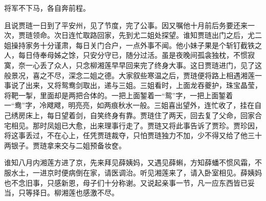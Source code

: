 将军不下马，各自奔前程。

且说贾琏一日到了平安州，见了节度，完了公事。因又嘱他十月前后务要还来一次，贾琏领命。次日连忙取路回家，先到尤二姐处探望。谁知贾琏出门之后，尤二姐操持家务十分谨肃，每日关门合户，一点外事不闻。他小妹子果是个斩钉截铁之人，每日侍奉母姊之馀，只安分守已，随分过活。虽是夜晚间孤衾独枕，不惯寂寞，奈一心丢了众人，只念柳湘莲早早回来完了终身大事。这日贾琏进门，见了这般景况，喜之不尽，深念二姐之德。大家叙些寒温之后，贾琏便将路上相遇湘莲一事说了出来，又将鸳鸯剑取出，递与三姐。三姐看时，上面龙吞夔护，珠宝晶莹，将靶一掣，里面却是两把合体的。一把上面錾着一``鸳''字，一把上面錾着一``鸯''字，冷飕飕，明亮亮，如两痕秋水一般。三姐喜出望外，连忙收了，挂在自己绣房床上，每日望着剑，自笑终身有靠。贾琏住了两天，回去复了父命，回家合宅相见。那时凤姐已大愈，出来理事行走了。贾琏又将此事告诉了贾珍。贾珍因，将这事丢过，不在心上，任凭贾琏裁夺，只怕贾琏独力不加，少不得又给了他三十两银子。贾琏拿来交与二姐预备妆奁。

谁知八月内湘莲方进了京，先来拜见薛姨妈，又遇见薛蝌，方知薛蟠不惯风霜，不服水土，一进京时便病倒在家，请医调治。听见湘莲来了，请入卧室相见。薛姨妈也不念旧事，只感新恩，母子们十分称谢。又说起亲事一节，凡一应东西皆已妥当，只等择日。柳湘莲也感激不尽。

